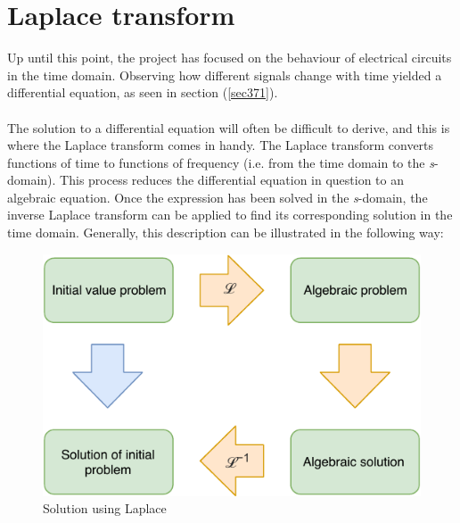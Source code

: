 \chapter{Laplace transform}
Up until this point, the project has focused on the behaviour of electrical circuits in the time domain. Observing how different signals change with time yielded a differential equation, as seen in section (\ref{sec371}).
\\ \\
The solution to a differential equation will often be difficult to derive, and this is where the Laplace transform comes in handy. The Laplace transform converts functions of time to functions of frequency (i.e. from the time domain to the \textit{s}-domain). This process reduces the differential equation in question to an algebraic equation. Once the expression has been solved in the \textit{s}-domain, the inverse Laplace transform can be applied to find its corresponding solution in the time domain. Generally, this description can be illustrated in the following way:
\begin{figure}[H]
\center
\includegraphics[scale=1]{fig/img/laplace_circ.pdf}
\caption{Solution using Laplace}
\label{lpsol}
\end{figure}

